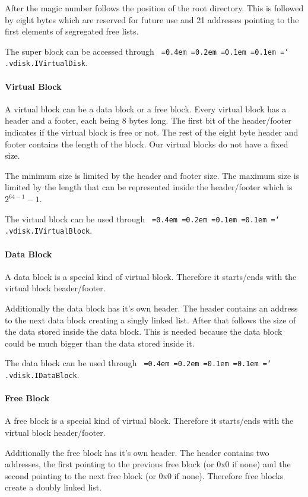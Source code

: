 \documentclass[a4paper,12pt]{article}
\newcommand*\justify{%
  \fontdimen2\font=0.4em%
  \fontdimen3\font=0.2em%
  \fontdimen4\font=0.1em%
  \fontdimen7\font=0.1em%
  \hyphenchar\font=`\-%
}
\newcommand{\mono}[1]{\texttt{\justify #1}}
\begin{document}
After the magic number follows the position of the root directory. This is followed by eight bytes which are reserved for future use and 21 addresses pointing to the first elements of segregated free lists.

The super block can be accessed through \mono{.vdisk.IVirtualDisk}.

\paragraph{Virtual Block}
A virtual block can be a data block or a free block. Every virtual block has a header and a footer, each being 8 bytes long. The first bit of the header/footer indicates if the virtual block is free or not. The rest of the eight byte header and footer contains the length of the block. Our virtual blocks do not have a fixed size.

The minimum size is limited by the header and footer size. The maximum size is limited by the length that can be represented inside the header/footer which is $2^{64-1} - 1$.

The virtual block can be used through \mono{.vdisk.IVirtualBlock}.

\paragraph{Data Block}
A data block is a special kind of virtual block. Therefore it starts/ends with the virtual block header/footer.

Additionally the data block has it's own header. The header contains an address to the next data block creating a singly linked list. After that follows the size of the data stored inside the data block. This is needed because the data block could be much bigger than the data stored inside it.

The data block can be used through \mono{.vdisk.IDataBlock}.

\paragraph{Free Block}
A free block is a special kind of virtual block. Therefore it starts/ends with the virtual block header/footer.

Additionally the free block has it's own header. The header contains two addresses, the first pointing to the previous free block (or 0x0 if none) and the second pointing to the next free block (or 0x0 if none). Therefore free blocks create a doubly linked list.
\end{document}
